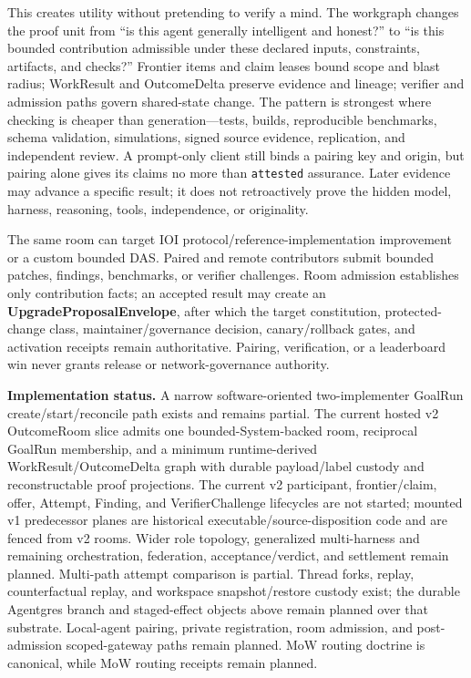 \documentclass[
  11pt,
]{article}
\begin{document}
This creates utility without pretending to verify a mind. The workgraph changes
the proof unit from ``is this agent generally intelligent and honest?'' to
``is this bounded contribution admissible under these declared inputs,
constraints, artifacts, and checks?'' Frontier items and claim leases bound
scope and blast radius; WorkResult and OutcomeDelta preserve evidence and
lineage; verifier and admission paths govern shared-state change. The pattern
is strongest where checking is cheaper than generation---tests, builds,
reproducible benchmarks, schema validation, simulations, signed source
evidence, replication, and independent review. A prompt-only client still
binds a pairing key and origin, but pairing alone gives its claims no more than
\texttt{attested} assurance. Later evidence may advance a specific result; it
does not retroactively prove the hidden model, harness, reasoning, tools,
independence, or originality.

The same room can target IOI protocol/reference-implementation improvement or
a custom bounded DAS. Paired and remote contributors submit bounded patches,
findings, benchmarks, or verifier challenges. Room admission establishes only
contribution facts; an accepted result may create an
\textbf{UpgradeProposalEnvelope}, after which the target constitution,
protected-change class, maintainer/governance decision, canary/rollback gates,
and activation receipts remain authoritative. Pairing, verification, or a
leaderboard win never grants release or network-governance authority.

\textbf{Implementation status.} A narrow software-oriented two-implementer
GoalRun create/start/reconcile path exists and remains partial. The current
hosted v2 OutcomeRoom slice admits one bounded-System-backed room, reciprocal
GoalRun membership, and a minimum runtime-derived WorkResult/OutcomeDelta graph
with durable payload/label custody and reconstructable proof projections. The
current v2 participant, frontier/claim, offer, Attempt, Finding, and
VerifierChallenge lifecycles are not started; mounted v1 predecessor planes are
historical executable/source-disposition code and are fenced from v2 rooms.
Wider role topology, generalized multi-harness and remaining orchestration,
federation, acceptance/verdict, and settlement remain planned. Multi-path
attempt comparison is partial.
Thread forks, replay,
counterfactual replay, and workspace snapshot/restore custody exist; the
durable Agentgres branch and staged-effect objects above remain planned over
that substrate. Local-agent pairing, private registration, room admission, and
post-admission scoped-gateway paths remain planned. MoW routing doctrine is
canonical, while MoW routing receipts remain planned.
\end{document}
